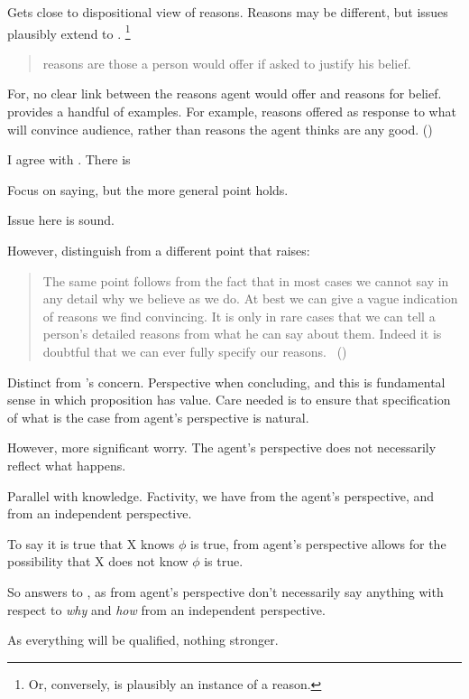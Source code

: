 \begin{note}
  Gets close to dispositional view of reasons.
  Reasons may be different, but issues plausibly extend to \support{}.%
  \footnote{
    Or, conversely, \support{} is plausibly an instance of a reason.
  }

  \begin{quote}
    reasons are those a person would offer if asked to justify his belief.
  \end{quote}

  For, no clear link between the reasons agent would offer and reasons for belief.
  \textcite{Harman:1973ww} provides a handful of examples.
  For example, reasons offered as response to what will convince audience, rather than reasons the agent thinks are any good.
  (\citeyear[26--27]{Harman:1973ww})

  I agree with \citeauthor{Harman:1973ww}.
  There is 

  Focus on saying, but the more general point holds.

  Issue here is sound.

  However, distinguish from a different point that \citeauthor{Harman:1973ww} raises:

  \begin{quote}
    The same point follows from the fact that in most cases we cannot say in any detail why we believe as we do.
    At best we can give a vague indication of reasons we find convincing.
    It is only in rare cases that we can tell a person’s detailed reasons from what he can say about them.
    Indeed it is doubtful that we can ever fully specify our reasons.%
    \mbox{ }\hfill\mbox{(\citeyear[28]{Harman:1973ww})}
  \end{quote}

  Distinct from \citeauthor{Harman:1973ww}'s concern.
  Perspective when concluding, and this is fundamental sense in which proposition has value.
  Care needed is to ensure that specification of what is the case from agent's perspective is natural.
\end{note}

\begin{note}
  However, more significant worry.
  The agent's perspective does not necessarily reflect what happens.

  Parallel with knowledge.
  Factivity, we have from the agent's perspective, and from an independent perspective.

  To say it is true that X knows \(\phi\) is true, from agent's perspective allows for the possibility that X does not know \(\phi\) is true.

  So answers to \qWhy{}, as from agent's perspective don't necessarily say anything with respect to \emph{why} and \emph{how} from an independent perspective.

  As everything will be qualified, nothing stronger.
\end{note}


